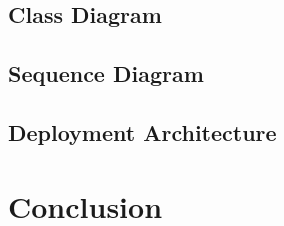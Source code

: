 \subsection{Class Diagram}

\subsection{Sequence Diagram}

\subsection{Deployment Architecture}
\section{Conclusion}
